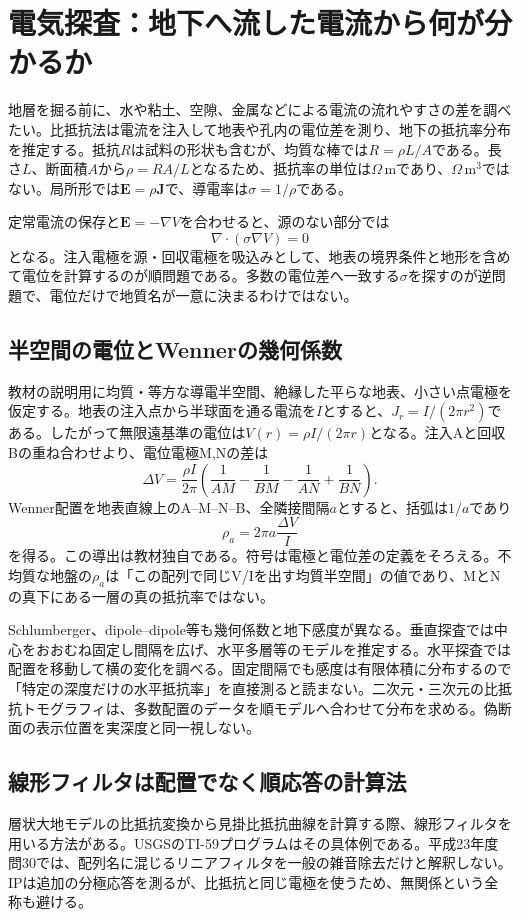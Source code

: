 \section{電気探査：地下へ流した電流から何が分かるか}
\label{theory:exploration:dcarrays}
地層を掘る前に、水や粘土、空隙、金属などによる電流の流れやすさの差を調べたい。比抵抗法は電流を注入して地表や孔内の電位差を測り、地下の抵抗率分布を推定する。抵抗\(R\)は試料の形状も含むが、均質な棒では\(R=\rho L/A\)である。長さ\(L\)、断面積\(A\)から\(\rho=RA/L\)となるため、抵抗率の単位は\(\Omega\,\mathrm m\)であり、\(\Omega\,\mathrm m^3\)ではない。局所形では\(\boldsymbol E=\rho\boldsymbol J\)で、導電率は\(\sigma=1/\rho\)である。

定常電流の保存と\(\boldsymbol E=-\nabla V\)を合わせると、源のない部分では
\[
 \nabla\cdot(\sigma\nabla V)=0
\]
となる。注入電極を源・回収電極を吸込みとして、地表の境界条件と地形を含めて電位を計算するのが順問題である。多数の電位差へ一致する\(\sigma\)を探すのが逆問題で、電位だけで地質名が一意に決まるわけではない\cite{epa_resistivity}。

\subsection*{半空間の電位とWennerの幾何係数}
教材の説明用に均質・等方な導電半空間、絶縁した平らな地表、小さい点電極を仮定する。地表の注入点から半球面を通る電流を\(I\)とすると、\(J_r=I/(2\pi r^2)\)である。したがって無限遠基準の電位は\(V(r)=\rho I/(2\pi r)\)となる。注入Aと回収Bの重ね合わせより、電位電極M,Nの差は
\[
 \Delta V=\frac{\rho I}{2\pi}
 \left(\frac1{AM}-\frac1{BM}-\frac1{AN}+\frac1{BN}\right).
\]
Wenner配置を地表直線上のA--M--N--B、全隣接間隔\(a\)とすると、括弧は\(1/a\)であり
\[
 \rho_a=2\pi a\frac{\Delta V}{I}
\]
を得る。この導出は教材独自である。符号は電極と電位差の定義をそろえる。不均質な地盤の\(\rho_a\)は「この配列で同じV/Iを出す均質半空間」の値であり、MとNの真下にある一層の真の抵抗率ではない。

Schlumberger、dipole--dipole等も幾何係数と地下感度が異なる。垂直探査では中心をおおむね固定し間隔を広げ、水平多層等のモデルを推定する。水平探査では配置を移動して横の変化を調べる。固定間隔でも感度は有限体積に分布するので「特定の深度だけの水平抵抗率」を直接測ると読まない。二次元・三次元の比抵抗トモグラフィは、多数配置のデータを順モデルへ合わせて分布を求める。偽断面の表示位置を実深度と同一視しない。

\subsection*{線形フィルタは配置でなく順応答の計算法}
層状大地モデルの比抵抗変換から見掛比抵抗曲線を計算する際、線形フィルタを用いる方法がある。USGSのTI-59プログラムはその具体例である\cite{usgs_linear_filter1981}。平成23年度問30では、配列名に混じるリニアフィルタを一般の雑音除去だけと解釈しない。IPは追加の分極応答を測るが、比抵抗と同じ電極を使うため、無関係という全称も避ける。

